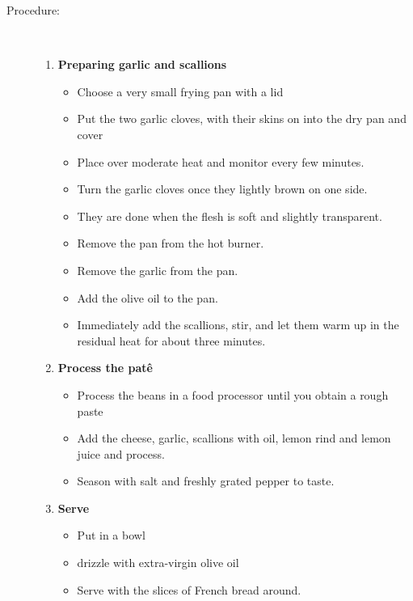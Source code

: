 \documentclass[11pt,letterpaper]{article}
\begin{document}
\begin{description}
\item[Procedure:]\ \\
	\begin{enumerate}
	\item {\bf Preparing garlic and scallions}
	\begin{itemize}
	\item Choose a very small frying pan with a lid
        \item Put the two garlic cloves, with their skins on into the dry pan and cover
	\item Place over moderate heat and monitor every few minutes.
	\item Turn the garlic cloves once they lightly brown on one side.
	\item They are done when the flesh is soft and slightly transparent.
	\item Remove the pan from the hot burner.
	\item Remove the garlic from the pan.
	\item Add the olive oil to the pan.
	\item Immediately add the scallions, stir, and let them warm up in the residual heat for about three minutes. 
	\end{itemize}
	\item {\bf Process the pat\^e}
	\begin{itemize}
	\item Process the beans in a food processor until you obtain a rough paste
	\item Add the cheese, garlic, scallions with oil, lemon rind and lemon juice and process.
	\item Season with salt and freshly grated pepper to taste.
	\end{itemize}
	\item {\bf Serve}
	\begin{itemize}
	\item Put in a bowl
	\item drizzle with extra-virgin olive oil
	\item Serve with the slices of French bread around.
	\end{itemize}
	\end{enumerate}
\end{description}
\end{document}
